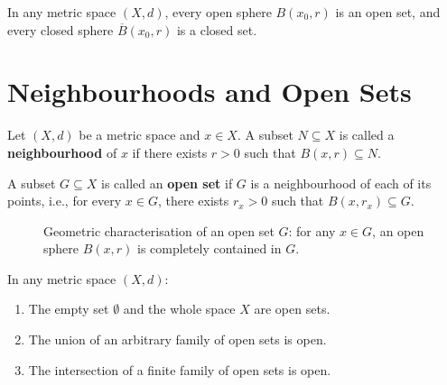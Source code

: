 \begin{theorem}
In any metric space $(X,d)$, every open sphere $B(x_0, r)$ is an open set, and every closed sphere $\overline{B}(x_0, r)$ is a closed set.
\end{theorem}


\section{Neighbourhoods and Open Sets}
\label{sec:open_sets}

\begin{definition}[Neighbourhood]
Let $(X,d)$ be a metric space and $x \in X$. A subset $N \subseteq X$ is called a \textbf{neighbourhood} of $x$ if there exists $r > 0$ such that $B(x,r) \subseteq N$.
\end{definition}

\begin{definition}
A subset $G \subseteq X$ is called an \textbf{open set} if $G$ is a neighbourhood of each of its points, i.e., for every $x \in G$, there exists $r_x > 0$ such that $B(x, r_x) \subseteq G$.
\end{definition}

\begin{figure}[htbp]
\centering
{}
\caption{Geometric characterisation of an open set $G$: for any $x \in G$, an open sphere $B(x,r)$ is completely contained in $G$.}
\label{fig:open_set_illustration}
\end{figure}

\begin{theorem}
In any metric space $(X,d)$:
\begin{enumerate}[label=\rm{(\roman*)}]
    \item The empty set $\emptyset$ and the whole space $X$ are open sets.
    \item The union of an arbitrary family of open sets is open.
    \item The intersection of a finite family of open sets is open.
\end{enumerate}
\end{theorem}


